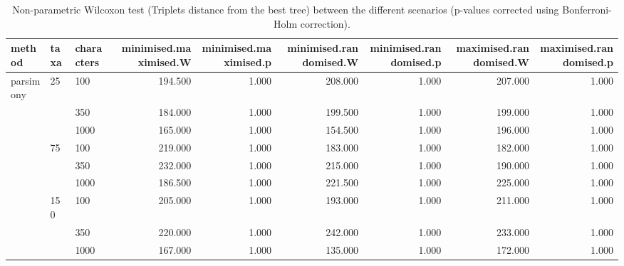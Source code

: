 \begin{table}[ht]
\centering
\begin{tabular}{lllrrrrrr}
  \hline
method & taxa & characters & minimised.maximised.W & minimised.maximised.p & minimised.randomised.W & minimised.randomised.p & maximised.randomised.W & maximised.randomised.p \\ 
  \hline
parsimony & 25 & 100 & 194.500 & 1.000 & 208.000 & 1.000 & 207.000 & 1.000 \\ 
   &  & 350 & 184.000 & 1.000 & 199.500 & 1.000 & 199.000 & 1.000 \\ 
   &  & 1000 & 165.000 & 1.000 & 154.500 & 1.000 & 196.000 & 1.000 \\ 
   & 75 & 100 & 219.000 & 1.000 & 183.000 & 1.000 & 182.000 & 1.000 \\ 
   &  & 350 & 232.000 & 1.000 & 215.000 & 1.000 & 190.000 & 1.000 \\ 
   &  & 1000 & 186.500 & 1.000 & 221.500 & 1.000 & 225.000 & 1.000 \\ 
   & 150 & 100 & 205.000 & 1.000 & 193.000 & 1.000 & 211.000 & 1.000 \\ 
   &  & 350 & 220.000 & 1.000 & 242.000 & 1.000 & 233.000 & 1.000 \\ 
   &  & 1000 & 167.000 & 1.000 & 135.000 & 1.000 & 172.000 & 1.000 \\ 
   \hline
\end{tabular}
\caption{Non-parametric Wilcoxon test (Triplets distance from the best tree) between the different scenarios (p-values corrected using Bonferroni-Holm correction).} 
\label{Full_Tab_Parsimony_WXTrbest}
\end{table}
